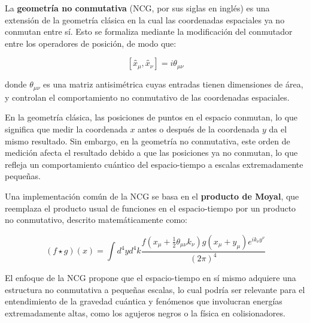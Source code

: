 La \textbf{geometría no conmutativa} (NCG, por sus siglas en inglés) es una extensión de la geometría clásica en la cual las coordenadas espaciales ya no conmutan entre sí. Esto se formaliza mediante la modificación del conmutador entre los operadores de posición, de modo que:

\[
[x̂_\mu, x̂_\nu] = iθ_{\mu\nu}
\]

donde \( θ_{\mu\nu} \) es una matriz antisimétrica cuyas entradas tienen dimensiones de área, y controlan el comportamiento no conmutativo de las coordenadas espaciales.

En la geometría clásica, las posiciones de puntos en el espacio conmutan, lo que significa que medir la coordenada \( x \) antes o después de la coordenada \( y \) da el mismo resultado. Sin embargo, en la geometría no conmutativa, este orden de medición afecta el resultado debido a que las posiciones ya no conmutan, lo que refleja un comportamiento cuántico del espacio-tiempo a escalas extremadamente pequeñas.

Una implementación común de la NCG se basa en el \textbf{producto de Moyal}, que reemplaza el producto usual de funciones en el espacio-tiempo por un producto no conmutativo, descrito matemáticamente como:

$$
(f \star g)(x) = \int d^4y d^4k \frac{f(x_\mu + \frac{1}{2}\theta_{\mu\nu}k_\nu)g(x_\mu + y_\mu)e^{ik_\nu y^\nu}}{(2\pi)^4}
$$

El enfoque de la NCG propone que el espacio-tiempo en sí mismo adquiere una estructura no conmutativa a pequeñas escalas, lo cual podría ser relevante para el entendimiento de la gravedad cuántica y fenómenos que involucran energías extremadamente altas, como los agujeros negros o la física en colisionadores.